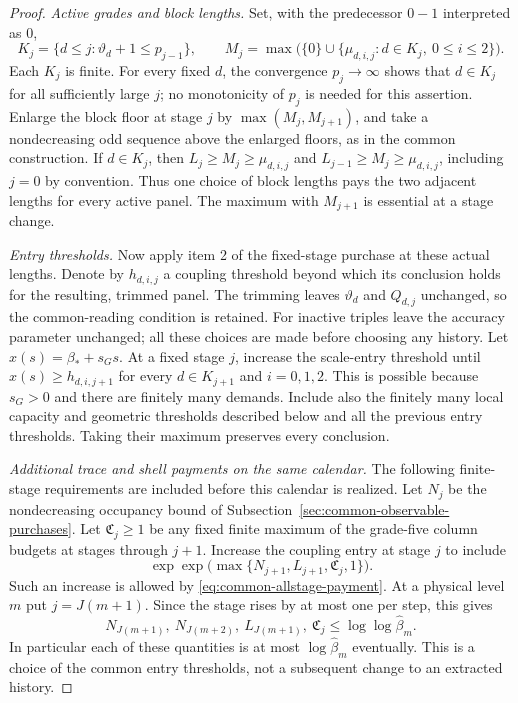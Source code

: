 \begin{proof}
\emph{Active grades and block lengths.}
Set, with the predecessor $0-1$ interpreted as $0$,
\[
 K_j=\{d\le j:\vartheta_d+1\le p_{j-1}\},\qquad
 M_j=\max\bigl(\{0\}\cup
       \{\mu_{d,i,j}:d\in K_j,\ 0\le i\le2\}\bigr).
\]
Each $K_j$ is finite. For every fixed $d$, the convergence $p_j\to\infty$
shows that $d\in K_j$ for all sufficiently large $j$; no monotonicity of
$p_j$ is needed for this assertion. Enlarge the block floor at stage $j$
by $\max(M_j,M_{j+1})$, and take a nondecreasing odd sequence above the
enlarged floors, as in the common construction. If $d\in K_j$, then
$L_j\ge M_j\ge\mu_{d,i,j}$ and
$L_{j-1}\ge M_j\ge\mu_{d,i,j}$, including $j=0$ by convention.
Thus one choice of block lengths pays the two adjacent lengths for every
active panel. The maximum with $M_{j+1}$ is essential at a stage change.

\emph{Entry thresholds.}
Now apply item 2 of the fixed-stage purchase at these actual lengths. Denote by
$h_{d,i,j}$ a coupling threshold beyond which its conclusion holds for
the resulting, trimmed panel. The trimming leaves $\vartheta_d$ and
$Q_{d,j}$ unchanged, so the common-reading condition is retained.
For inactive triples leave the accuracy parameter unchanged; all these
choices are made before choosing any history. Let
$x(s)=\beta_*+s_Gs$. At a fixed stage $j$, increase the scale-entry
threshold until $x(s)\ge h_{d,i,j+1}$ for every
$d\in K_{j+1}$ and $i=0,1,2$. This is possible because $s_G>0$ and
there are finitely many demands. Include also the finitely many local
capacity and geometric thresholds described below and all the previous
entry thresholds. Taking their maximum preserves every conclusion.

\emph{Additional trace and shell payments on the same calendar.}
The following finite-stage requirements are included before this calendar
is realized. Let $N_j$ be the nondecreasing occupancy bound of
Subsection~\ref{sec:common-observable-purchases}. Let $\mathfrak C_j\ge1$ be any fixed
finite maximum of the grade-five column budgets at stages through $j+1$.
Increase the coupling entry at stage $j$ to include
\[
 \exp\!\exp\!\bigl(\max\{N_{j+1},L_{j+1},\mathfrak C_j,1\}\bigr).
\]
Such an increase is allowed by \eqref{eq:common-allstage-payment}.
At a physical level $m$ put $j=J(m+1)$. Since the stage rises by at
most one per step, this gives
\begin{equation}\label{eq:trace-extra-stage-payment}
 N_{J(m+1)},\ N_{J(m+2)},\ L_{J(m+1)},\ \mathfrak C_j
       \le\log\log\widehat\beta_m.
\end{equation}
In particular each of these quantities is at most
$\log\widehat\beta_m$ eventually. This is a choice of the common
entry thresholds, not a subsequent change to an extracted history.


\end{proof}

